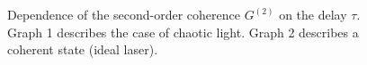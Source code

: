 \begin{figure}
\centering



\caption{Dependence of the second-order coherence $G^{(2)}$ on the delay $\tau$. Graph 1 describes the case of chaotic light. Graph 2 describes a coherent state (ideal laser).}
\label{figPart4Ch2_4a}
\end{figure}